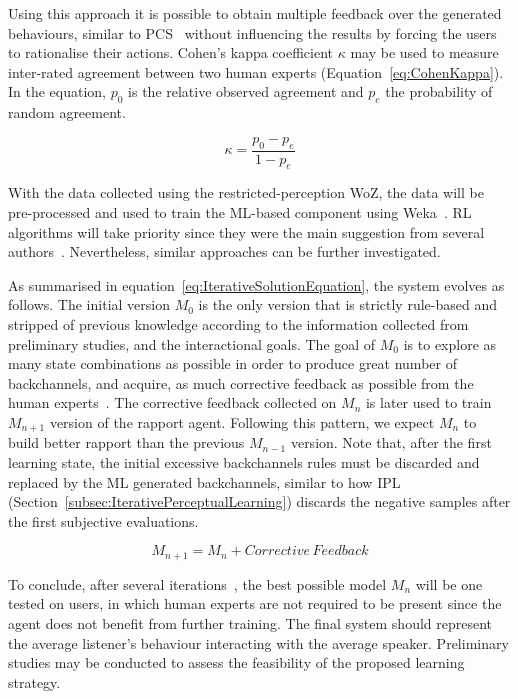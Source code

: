 Using this approach it is possible to obtain multiple feedback over the generated behaviours, similar to \ac{PCS}~\cite{Huang2010} without influencing the results by forcing the users to rationalise their actions. Cohen's kappa coefficient $\kappa$ may be used to measure inter-rated agreement between two human experts (Equation~\ref{eq:CohenKappa}). In the equation, $p_0$ is the relative observed agreement and $p_e$ the probability of random agreement.


\vspace{-3mm}
\begin{equation}
	\label{eq:CohenKappa}
	\kappa = \frac{p_0 - p_e}{1 - p_e}
\end{equation}

With the data collected using the restricted-perception \ac{WoZ}, the data will be pre-processed and used to train the \ac{ML}-based component using Weka~\cite{Hall2009}. \ac{RL} algorithms will take priority since they were the main suggestion from several authors~\cite{Thomaz2006, Kok2012, Zhao2014, Papangelis2014, Blumberg2002, Andrist2015, Mutlu2006}. Nevertheless, similar approaches can be further investigated. 

As summarised in equation~\ref{eq:IterativeSolutionEquation}, the system evolves as follows. The initial version $M_0$ is the only version that is strictly rule-based and stripped of previous knowledge according to the information collected from preliminary studies, and the interactional goals. The goal of $M_0$ is to explore as many state combinations as possible in order to produce great number of backchannels, and acquire, as much corrective feedback as possible from the human experts~\cite{Kok2012}. The corrective feedback collected on $M_n$ is later used to train $M_{n+1}$ version of the rapport agent. Following this pattern, we expect $M_n$ to build better rapport than the previous $M_{n-1}$ version. Note that, after the first learning state, the initial excessive backchannels rules must be discarded and replaced by the \ac{ML} generated backchannels, similar to how \ac{IPL} (Section~\ref{subsec:IterativePerceptualLearning}) discards the negative samples after the first subjective evaluations. 

\vspace{-3mm}
\begin{equation}
	\label{eq:IterativeSolutionEquation}
	M_{n+1} = M_{n} + Corrective\, Feedback
\end{equation}

To conclude, after several iterations~\cite{Sequeira2016, Kok2012}, the best possible model $M_n$ will be one tested on users, in which human experts are not required to be present since the agent does not benefit from further training. The final system should represent the average listener's behaviour interacting with the average speaker. Preliminary studies may be conducted to assess the feasibility of the proposed learning strategy.